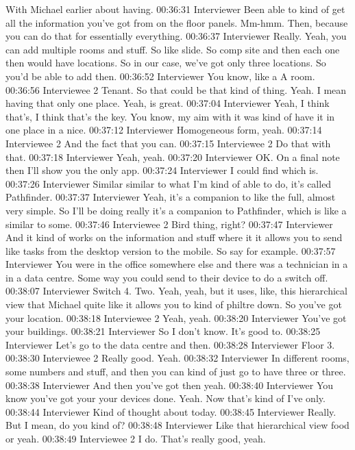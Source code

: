 With Michael earlier about having.
00:36:31 Interviewer
Been able to kind of get all the information you've got from on the floor panels. Mm-hmm. Then, because you can do that for essentially everything.
00:36:37 Interviewer
Really. Yeah, you can add multiple rooms and stuff. So like slide. So comp site and then each one then would have locations. So in our case, we've got only three locations. So you'd be able to add then.
00:36:52 Interviewer
You know, like a A room.
00:36:56 Interviewee 2 
Tenant. So that could be that kind of thing. Yeah. I mean having that only one place. Yeah, is great.
00:37:04 Interviewer
Yeah, I think that's, I think that's the key. You know, my aim with it was kind of have it in one place in a nice.
00:37:12 Interviewer
Homogeneous form, yeah.
00:37:14 Interviewee 2 
And the fact that you can.
00:37:15 Interviewee 2 
Do that with that.
00:37:18 Interviewer
Yeah, yeah.
00:37:20 Interviewer
OK. On a final note then I'll show you the only app.
00:37:24 Interviewer
I could find which is.
00:37:26 Interviewer
Similar similar to what I'm kind of able to do, it's called Pathfinder.
00:37:37 Interviewer
Yeah, it's a companion to like the full, almost very simple. So I'll be doing really it's a companion to Pathfinder, which is like a similar to some.
00:37:46 Interviewee 2 
Bird thing, right?
00:37:47 Interviewer
And it kind of works on the information and stuff where it it allows you to send like tasks from the desktop version to the mobile. So say for example.
00:37:57 Interviewer
You were in the office somewhere else and there was a technician in a in a data centre. Some way you could send to their device to do a switch off.
00:38:07 Interviewer
Switch 4. Two. Yeah, yeah, but it uses, like, this hierarchical view that Michael quite like it allows you to kind of philtre down. So you've got your location.
00:38:18 Interviewee 2 
Yeah, yeah.
00:38:20 Interviewer
You've got your buildings.
00:38:21 Interviewer
So I don't know. It's good to.
00:38:25 Interviewer
Let's go to the data centre and then.
00:38:28 Interviewer
Floor 3.
00:38:30 Interviewee 2 
Really good. Yeah.
00:38:32 Interviewer
In different rooms, some numbers and stuff, and then you can kind of just go to have three or three.
00:38:38 Interviewer
And then you've got then yeah.
00:38:40 Interviewer
You know you've got your your devices done. Yeah. Now that's kind of I've only.
00:38:44 Interviewer
Kind of thought about today.
00:38:45 Interviewer
Really. But I mean, do you kind of?
00:38:48 Interviewer
Like that hierarchical view food or yeah.
00:38:49 Interviewee 2 
I do. That's really good, yeah.
